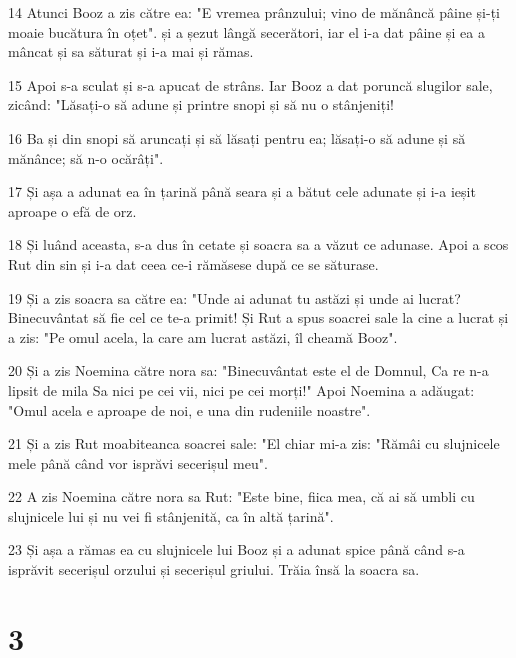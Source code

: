 \par 14 Atunci Booz a zis către ea: "E vremea prânzului; vino de mănâncă pâine și-ți moaie bucătura în oțet". și a șezut lângă secerători, iar el i-a dat pâine și ea a mâncat și sa săturat și i-a mai și rămas.
\par 15 Apoi s-a sculat și s-a apucat de strâns. Iar Booz a dat poruncă slugilor sale, zicând: "Lăsați-o să adune și printre snopi și să nu o stânjeniți!
\par 16 Ba și din snopi să aruncați și să lăsați pentru ea; lăsați-o să adune și să mănânce; să n-o ocărâți".
\par 17 Și așa a adunat ea în țarină până seara și a bătut cele adunate și i-a ieșit aproape o efă de orz.
\par 18 Și luând aceasta, s-a dus în cetate și soacra sa a văzut ce adunase. Apoi a scos Rut din sin și i-a dat ceea ce-i rămăsese după ce se săturase.
\par 19 Și a zis soacra sa către ea: "Unde ai adunat tu astăzi și unde ai lucrat? Binecuvântat să fie cel ce te-a primit! Și Rut a spus soacrei sale la cine a lucrat și a zis: "Pe omul acela, la care am lucrat astăzi, îl cheamă Booz".
\par 20 Și a zis Noemina către nora sa: "Binecuvântat este el de Domnul, Ca re n-a lipsit de mila Sa nici pe cei vii, nici pe cei morți!" Apoi Noemina a adăugat: "Omul acela e aproape de noi, e una din rudeniile noastre".
\par 21 Și a zis Rut moabiteanca soacrei sale: "El chiar mi-a zis: "Rămâi cu slujnicele mele până când vor isprăvi secerișul meu".
\par 22 A zis Noemina către nora sa Rut: "Este bine, fiica mea, că ai să umbli cu slujnicele lui și nu vei fi stânjenită, ca în altă țarină".
\par 23 Și așa a rămas ea cu slujnicele lui Booz și a adunat spice până când s-a isprăvit secerișul orzului și secerișul griului. Trăia însă la soacra sa.

\chapter{3}

